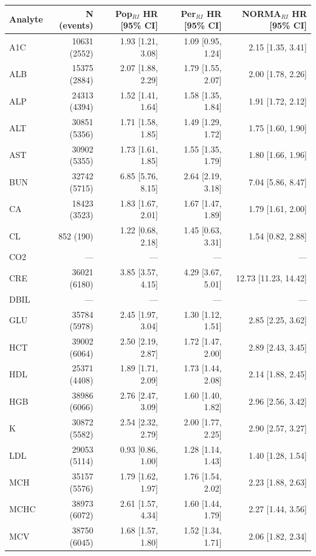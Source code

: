 \begin{table}[ht]
\centering
\footnotesize
\begin{tabular}{lrrrr}
\toprule
Analyte & N (events) & Pop$_{RI}$ HR [95\% CI] & Per$_{RI}$ HR [95\% CI] & NORMA$_{RI}$ HR [95\% CI] \\
\midrule
A1C & 10631 (2552) & 1.93 [1.21, 3.08] & 1.09 [0.95, 1.24] & 2.15 [1.35, 3.41] \\
ALB & 15375 (2884) & 2.07 [1.88, 2.29] & 1.79 [1.55, 2.07] & 2.00 [1.78, 2.26] \\
ALP & 24313 (4394) & 1.52 [1.41, 1.64] & 1.58 [1.35, 1.84] & 1.91 [1.72, 2.12] \\
ALT & 30851 (5356) & 1.71 [1.58, 1.85] & 1.49 [1.29, 1.72] & 1.75 [1.60, 1.90] \\
AST & 30902 (5355) & 1.73 [1.61, 1.85] & 1.55 [1.35, 1.79] & 1.80 [1.66, 1.96] \\
BUN & 32742 (5715) & 6.85 [5.76, 8.15] & 2.64 [2.19, 3.18] & 7.04 [5.86, 8.47] \\
CA & 18423 (3523) & 1.83 [1.67, 2.01] & 1.67 [1.47, 1.89] & 1.79 [1.61, 2.00] \\
CL & 852 (190) & 1.22 [0.68, 2.18] & 1.45 [0.63, 3.31] & 1.54 [0.82, 2.88] \\
CO2 & --- & --- & --- & --- \\
CRE & 36021 (6180) & 3.85 [3.57, 4.15] & 4.29 [3.67, 5.01] & 12.73 [11.23, 14.42] \\
DBIL & --- & --- & --- & --- \\
GLU & 35784 (5978) & 2.45 [1.97, 3.04] & 1.30 [1.12, 1.51] & 2.85 [2.25, 3.62] \\
HCT & 39002 (6064) & 2.50 [2.19, 2.87] & 1.72 [1.47, 2.00] & 2.89 [2.43, 3.45] \\
HDL & 25371 (4408) & 1.89 [1.71, 2.09] & 1.73 [1.44, 2.08] & 2.14 [1.88, 2.45] \\
HGB & 38986 (6066) & 2.76 [2.47, 3.09] & 1.60 [1.40, 1.82] & 2.96 [2.56, 3.42] \\
K & 30872 (5582) & 2.54 [2.32, 2.79] & 2.00 [1.77, 2.25] & 2.90 [2.57, 3.27] \\
LDL & 29053 (5114) & 0.93 [0.86, 1.00] & 1.28 [1.14, 1.43] & 1.40 [1.28, 1.54] \\
MCH & 35157 (5576) & 1.79 [1.62, 1.97] & 1.76 [1.54, 2.02] & 2.23 [1.88, 2.63] \\
MCHC & 38973 (6072) & 2.61 [1.57, 4.34] & 1.60 [1.44, 1.79] & 2.27 [1.44, 3.56] \\
MCV & 38750 (6045) & 1.68 [1.57, 1.80] & 1.52 [1.34, 1.71] & 2.06 [1.82, 2.34] \\

\end{tabular}
\end{table}
